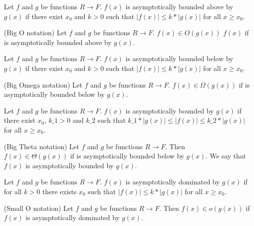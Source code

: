 \begin{definition}
\leanok
    Let $f$ and $g$ be functions $R \to F$. $f(x)$ is asymptotically bounded above by $g(x)$ if 
    there exist $x_0$ and $k > 0$ such that $|f(x)| \le k*|g(x)|$ for all $x \ge x_0$.
\end{definition}

\begin{definition}(Big O notation)
\leanok
    Let $f$ and $g$ be functions $R \to F$. $f(x) \in O(g(x))$ $f(x)$ if is asymptotically 
    bounded above by $g(x)$.
\end{definition}

\begin{definition}
\leanok
    Let $f$ and $g$ be functions $R \to F$. $f(x)$ is asymptotically bounded below by $g(x)$ if 
    there exist $x_0$ and $k > 0$ such that $|f(x)| \le k*|g(x)|$ for all $x \ge x_0$.
\end{definition}

\begin{definition}(Big Omega notation)
\leanok
    Let $f$ and $g$ be functions $R \to F$. $f(x) \in \Omega(g(x))$ if is asymptotically 
    bounded below by $g(x)$.
\end{definition}

\begin{definition}
\leanok
    Let $f$ and $g$ be functions $R \to F$. $f(x)$ is asymptotically bounded by $g(x)$ if 
    there exist $x_0$, $k\_1 > 0$ and $k\_2$ such that $k\_1*|g(x)| \le |f(x)| \le k\_2*|g(x)|$ 
    for all $x \ge x_0$.
\end{definition}

\begin{definition}(Big Theta notation)
\leanok
    Let $f$ and $g$ be functions $R \to F$. Then $f(x) \in \Theta(g(x))$ if is asymptotically 
    bounded below by $g(x)$. We say that $f(x)$ is asymptotically bounded by $g(x)$.
\end{definition}

\begin{definition}
\leanok
    Let $f$ and $g$ be functions $R \to F$. $f(x)$ is asymptotically dominated by $g(x)$ if 
    for all $k > 0$ there exists $x_0$ such that $|f(x)| \le k*|g(x)|$ for all $x \ge x_0$.
\end{definition}

\begin{definition}(Small O notation)
\leanok
    Let $f$ and $g$ be functions $R \to F$. Then $f(x) \in o(g(x))$ if $f(x)$ 
    is asymptotically dominated by $g(x)$.
\end{definition}

